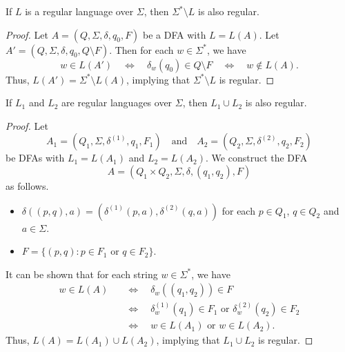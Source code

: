 \begin{theorem}
  If $L$ is a regular language over $\Sigma$, then $\Sigma^* \setminus L$
  is also regular.
\end{theorem}
\begin{proof}
  Let $A = (Q, \Sigma, \delta, q_0, F)$ be a DFA with $L = L(A)$.
  Let $A' = (Q, \Sigma, \delta, q_0, Q \setminus F)$.
  Then for each $w \in \Sigma^*$, we have
  \begin{equation*}
    w \in L(A')
    \quad \Leftrightarrow \quad \delta_w(q_0) \in Q \setminus F
    \quad \Leftrightarrow \quad w \notin L(A).
  \end{equation*}
  Thus, $L(A') = \Sigma^* \setminus L(A)$, implying that $\Sigma^* \setminus L$
  is regular.
\end{proof}

\begin{theorem}
  \label{thm:regular-union}
  If $L_1$ and $L_2$ are regular languages over $\Sigma$, then $L_1 \cup L_2$
  is also regular.
\end{theorem}
\begin{proof}
  Let
  \begin{equation*}
    A_1 = (Q_1, \Sigma, \delta^{(1)}, q_1, F_1)
    \quad \text{and} \quad
    A_2 = (Q_2, \Sigma, \delta^{(2)}, q_2, F_2)
  \end{equation*}
  be DFAs with $L_1 = L(A_1)$ and $L_2 = L(A_2)$.
  We construct the DFA
  \begin{equation*}
    A = (Q_1 \times Q_2, \Sigma, \delta, (q_1, q_2), F)
  \end{equation*}
  as follows.
  \begin{itemize}
    \item $\delta((p, q), a) = (\delta^{(1)}(p, a), \delta^{(2)}(q, a))$ for
    each $p \in Q_1$, $q \in Q_2$ and $a \in \Sigma$.
    \item $F = \{(p, q): \text{$p \in F_1$ or $q \in F_2$}\}$.
  \end{itemize}
  It can be shown that for each string $w \in \Sigma^*$, we have
  \begin{align*}
    w \in L(A)
    &\quad \Leftrightarrow \quad \delta_w((q_1, q_2)) \in F \\
    &\quad \Leftrightarrow \quad \text{$\delta^{(1)}_w(q_1) \in F_1$ or
    $\delta^{(2)}_w(q_2) \in F_2$} \\
    &\quad \Leftrightarrow \quad \text{$w \in L(A_1)$ or $w \in L(A_2)$}.
  \end{align*}
  Thus, $L(A) = L(A_1) \cup L(A_2)$, implying that $L_1 \cup L_2$ is regular.
\end{proof}


